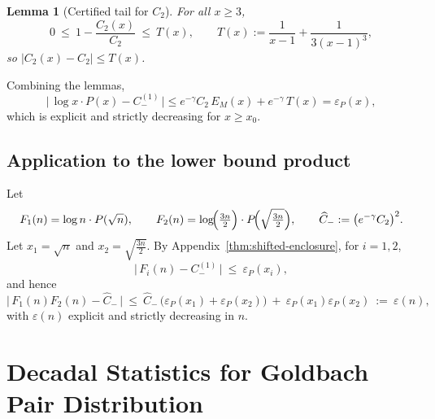 \documentclass[11pt]{article}
\theoremstyle{inline}
\theoremstyle{break}
\newtheorem{lemma}{Lemma}
\theoremstyle{break}
\theoremstyle{break}
\theoremstyle{break}
\theoremstyle{break}
\theoremstyle{inline}
\begin{document}
\begin{lemma}[Certified tail for \( C_2 \)]\label{lem:C2-tail}
For all \( x\ge 3 \),
\begin{equation}
0\ \le\ 1-\frac{C_2(x)}{C_2}\ \le\ T(x),
\qquad
T(x) := \frac{1}{x-1}+\frac{1}{3(x-1)^3},
\end{equation}
so \( |C_2(x)-C_2|\le T(x) \).
\end{lemma}

Combining the lemmas,
\begin{equation}
\bigl|\,\log x\cdot P(x) - C_-^{(1)}\,\bigr|
\le e^{-\gamma}C_2\,E_M(x) + e^{-\gamma}\,T(x) = \varepsilon_P(x),
\end{equation}
which is explicit and strictly decreasing for \( x\ge x_0 \).


\subsection*{Application to the lower bound product}
Let
\begin{equation}
F_1(n)=\log n\cdot P(\sqrt{n}),\qquad
F_2(n)=\log\!\Bigl(\tfrac{3n}{2}\Bigr)\cdot P\!\Bigl(\sqrt{\tfrac{3n}{2}}\Bigr),
\qquad
\widehat C_- := \bigl(e^{-\gamma}C_2\bigr)^2 .
\end{equation}
Let \(x_1=\sqrt{n}\) and \(x_2=\sqrt{\frac{3n}{2}}\).
By Appendix~\ref{thm:shifted-enclosure}, for \( i=1,2 \),
\begin{equation}
\bigl|\,F_i(n)-C_-^{(1)}\,\bigr|\ \le\ \varepsilon_P(x_i),
\end{equation}
and hence
\begin{equation}
\bigl|\,F_1(n)F_2(n)-\widehat C_-\,\bigr|
\ \le\ \widehat C_-\,\bigl(\varepsilon_P(x_1)+\varepsilon_P(x_2)\bigr)
\ +\ \varepsilon_P(x_1)\varepsilon_P(x_2)
\ :=\ \varepsilon(n),
\end{equation}
with \( \varepsilon(n) \) explicit and strictly decreasing in \( n \).


\appendix
\clearpage

\section{Decadal Statistics for Goldbach Pair Distribution}\label{app:decadal}


\setlength{\LTpre}{0pt}
\setlength{\LTpost}{0pt}
\end{document}
